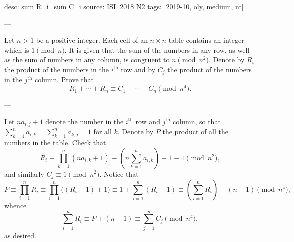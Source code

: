 desc: sum R_i=sum C_i
source: ISL 2018 N2
tags: [2019-10, oly, medium, nt]

---

Let $n>1$ be a positive integer. Each cell of an $n\times n$ table contains an integer which is $1\pmod n$. It is given that the sum of the numbers in any row, as well as the sum of numbers in any column, is congruent to $n\pmod{n^2}$. Denote by $R_i$ the product of the numbers in the $i^\text{th}$ row and by $C_j$ the product of the numbers in the $j^\text{th}$ column. Prove that \[R_1+\cdots+R_n\equiv C_1+\cdots+C_n\pmod{n^4}.\]

---

Let $na_{i,j}+1$ denote the number in the $i^\text{th}$ row and $j^\text{th}$ column, so that $\sum_{k=1}^na_{i,k}=\sum_{k=1}^na_{k,j}=1$ for all $k$. Denote by $P$ the product of all the numbers in the table. Check that \[R_i\equiv\prod_{k=1}^n(na_{i,k}+1)\equiv\left(n\sum_{k=1}^na_{i,k}\right)+1\equiv1\pmod{n^2},\]
and similarly $C_j\equiv1\pmod{n^2}$. Notice that \[P\equiv\prod_{i=1}^nR_i\equiv\prod_{i=1}^n\Big((R_i-1)+1\Big)\equiv1+\sum_{i=1}^n(R_i-1)\equiv\left(\sum_{i=1}^n R_i\right)-(n-1)\pmod{n^4},\]
whence \[\sum_{i=1}^n R_i\equiv P+(n-1)\equiv\sum_{j=1}^n C_j\pmod{n^4},\]
as desired.
